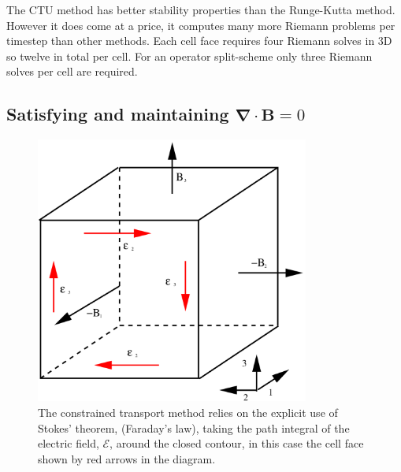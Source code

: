The CTU method has better stability properties than the Runge-Kutta method.
However it does come at a price, it computes many more Riemann problems per
timestep than other methods. Each cell face requires four Riemann solves in 3D so twelve in total per cell. For an operator split-scheme only three Riemann solves per cell are required.



\subsection{Satisfying and maintaining $\boldsymbol{\nabla} \cdot \mathbf{B} = 0$}


\begin{figure}[t]
\centering
\includegraphics[width=9cm]{constraint_equation}
\caption{
The constrained transport method relies on the explicit use of Stokes' theorem, (Faraday's law), taking the path integral of the electric field, $\mathcal{E}$, around the closed contour, in this case the cell face shown by red arrows in the diagram.
}
\label{fig:2-21} %
\end{figure}

